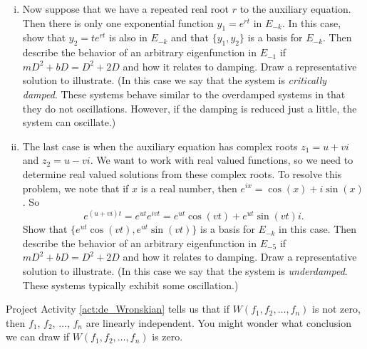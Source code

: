 \begin{pactivity}
\begin{enumerate}[i.]
	\item Now suppose that we have a repeated real root $r$ to the auxiliary equation. Then there is only one exponential function $y_1 = e^{rt}$ in $E_{-k}$. In this case, show that $y_2 = te^{rt}$ is also in $E_{-k}$ and that $\{y_1, y_2\}$ is a basis for $E_{-k}$. Then describe the behavior of an arbitrary eigenfunction in $E_{-1}$ if $mD^2+bD = D^2+2D$ and how it relates to damping. Draw a representative solution to illustrate. (In this case we say that the system is \emph{critically damped}. These systems behave similar to the overdamped systems in that they do not oscillations. However, if the damping is reduced just a little, the system can oscillate.)
	
	\item The last case is when the auxiliary equation has complex roots $z_1 = u+vi$ and $z_2 = u-vi$. We want to work with real valued functions, so we need to determine real valued solutions from these complex roots. To resolve this problem, we note that if $x$ is a real number, then $e^{ix} = \cos(x) + i \sin(x)$. So 
	\[e^{(u+vi)t} = e^{ut}e^{ivt} = e^{ut} \cos(vt) + e^{ut}\sin(vt)i.\]
	Show that $\{e^{ut} \cos(vt), e^{ut} \sin(vt)\}$ is a basis for $E_{-k}$ in this case. Then describe the behavior of an arbitrary eigenfunction in $E_{-5}$ if $mD^2+bD = D^2+2D$ and how it relates to damping. Draw a representative solution to illustrate. (In this case we say that the system is \emph{underdamped}. These systems typically exhibit some oscillation.)

	
	\end{enumerate} 
	
\ea


\end{pactivity}


Project Activity \ref{act:de_Wronskian} tells us that if $W(f_1, f_2, \ldots, f_n)$ is not zero, then $f_1$, $f_2$, $\ldots$, $f_n$ are linearly independent. You might wonder what conclusion we can draw if $W(f_1, f_2, \ldots, f_n)$ is zero. 


